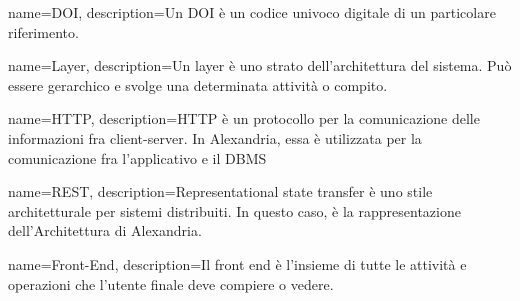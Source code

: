 {
    name={DOI},
    description={Un DOI è un codice univoco digitale di un particolare riferimento.}
}

{
    name={Layer},
    description={Un layer è uno strato dell'architettura del sistema. Può essere gerarchico e svolge una determinata attività o compito.}
}

{
    name={HTTP},
    description={HTTP è un protocollo per la comunicazione delle informazioni fra client-server. In Alexandria, essa è utilizzata per la comunicazione fra l'applicativo e il DBMS}
}

{
    name={REST},
    description={Representational state transfer è uno stile architetturale per sistemi distribuiti. In questo caso, è la rappresentazione dell'Architettura di Alexandria.}
}


{
    name={Front-End},
    description={Il front end è l'insieme di tutte le attività e operazioni che l'utente finale deve compiere o vedere.}
}

\printglossaries

